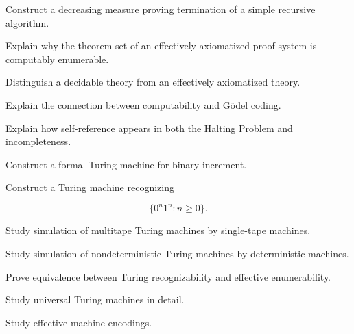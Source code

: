 \begin{exercise}[3]
Construct a decreasing measure proving termination of a simple recursive
algorithm.
\end{exercise}

\begin{exercise}[3]
Explain why the theorem set of an effectively axiomatized proof system is
computably enumerable.
\end{exercise}

\begin{exercise}[3]
Distinguish a decidable theory from an effectively axiomatized theory.
\end{exercise}

\begin{exercise}[3]
Explain the connection between computability and Gödel coding.
\end{exercise}

\begin{exercise}[3]
Explain how self-reference appears in both the Halting Problem and
incompleteness.
\end{exercise}

\begin{exercise}[4]
Construct a formal Turing machine for binary increment.
\end{exercise}

\begin{exercise}[4]
Construct a Turing machine recognizing

\[
\{0^n1^n:n\geq0\}.
\]
\end{exercise}

\begin{exercise}[4]
Study simulation of multitape Turing machines by single-tape machines.
\end{exercise}

\begin{exercise}[4]
Study simulation of nondeterministic Turing machines by deterministic
machines.
\end{exercise}

\begin{exercise}[4]
Prove equivalence between Turing recognizability and effective
enumerability.
\end{exercise}

\begin{exercise}[4]
Study universal Turing machines in detail.
\end{exercise}

\begin{exercise}[4]
Study effective machine encodings.
\end{exercise}

